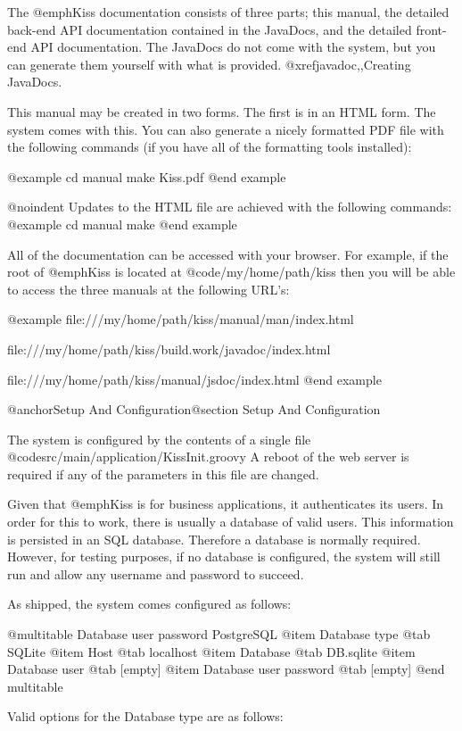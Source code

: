 The @emph{Kiss} documentation consists of three parts; this manual,
the detailed back-end API documentation contained in the JavaDocs, and
the detailed front-end API documentation.  The JavaDocs do not come
with the system, but you can generate them yourself with what is
provided.  @xref{javadoc,,Creating JavaDocs}.

This manual may be created in two forms.  The first is in an HTML
form.  The system comes with this.  You can also generate a nicely
formatted PDF file with the following commands (if you have all of the
formatting tools installed):

@example
cd manual
make Kiss.pdf
@end example

@noindent
Updates to the HTML file are achieved with the following commands:
@example
cd manual
make
@end example

All of the documentation can be accessed with your browser.  For
example, if the root of @emph{Kiss} is located at
@code{/my/home/path/kiss} then you will be able to access the three
manuals at the following URL's:

@example
file:///my/home/path/kiss/manual/man/index.html

file:///my/home/path/kiss/build.work/javadoc/index.html

file:///my/home/path/kiss/manual/jsdoc/index.html
@end example

@anchor{Setup And Configuration}@section Setup And Configuration

The system is configured by the contents of a single file
@code{src/main/application/KissInit.groovy} A reboot of the web server
is required if any of the parameters in this file are changed.

Given that @emph{Kiss} is for business applications, it authenticates its
users.  In order for this to work, there is usually a database of valid
users.  This information is persisted in an SQL database.  Therefore a
database is normally required.  However, for testing purposes, if no
database is configured, the system will still run and allow any
username and password to succeed.

As shipped, the system comes configured as follows:

@multitable {Database user password} {PostgreSQL} 
@item Database type
@tab SQLite
@item Host
@tab localhost
@item Database
@tab DB.sqlite
@item Database user
@tab [empty]
@item Database user password
@tab [empty]
@end multitable

Valid options for the Database type are as follows:

